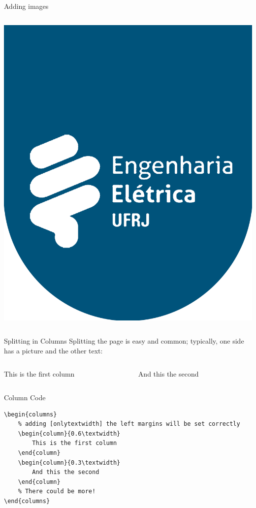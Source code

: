 \begin{frame}[fragile]{Adding images}
\begin{columns}
\begin{column}{0.3\textwidth}
\includegraphics[width=\textwidth]
{theme/assets/logo_RGB}
\end{column}
\end{columns}
\end{frame}


\begin{frame}[fragile]{Splitting in Columns}
Splitting the page is easy and common; typically, one side has a picture and the other text:
\begin{columns}  %
\begin{column}{0.6\textwidth}
This is the first column
\end{column}
\begin{column}{0.3\textwidth}
And this the second
\end{column}
\end{columns}
\begin{block}{Column Code}
\begin{verbatim}
\begin{columns} 
    % adding [onlytextwidth] the left margins will be set correctly
    \begin{column}{0.6\textwidth}
        This is the first column
    \end{column}
    \begin{column}{0.3\textwidth}
        And this the second
    \end{column}
    % There could be more!
\end{columns}
\end{verbatim}
\end{block}

\end{frame}
